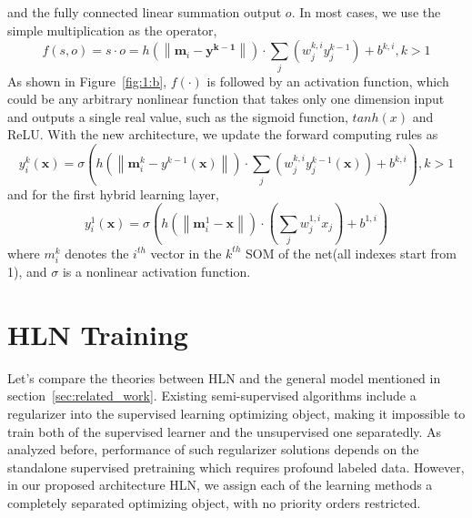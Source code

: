 \documentclass[3p,times,procedia]{elsarticle}
\begin{document}
and the fully connected linear summation 
output $o$. In most cases, we use the
simple multiplication as the operator,
\begin{equation}
	f(s,o) = s\cdot o = 
	h\left(
	\left\|
	\mathbf{m}_i-\mathbf{y^{k-1}}
	\right\|
	\right)
	\cdot
	\sum_j
	\left(
	w_j^{k,i}y_j^{k-1}
	\right)
	+b^{k,i},k>1
	\label{eq:14}
\end{equation}
As shown in Figure~\ref{fig:1:b}, 
$f(\cdot) $ is followed 
by an activation function, which could 
be any 
arbitrary nonlinear function that 
takes 
only one dimension input and 
outputs a 
single real value, 
such as the sigmoid function, 
$tanh(x)$ and ReLU. 
With the new 
architecture, 
we update the forward computing
rules as 
\begin{equation}
	y_i^k(\mathbf{x})=
	\sigma\left(
	h\left(
	\left\|
	\mathbf{m}_i^k-y^{k-1}(\mathbf{x})
	\right\|
	\right)\cdot
	\sum_j\left(
	w_j^{k,i}y_j^{k-1}(\mathbf{x})
	\right) + b^{k,i}
	\right), k>1
	\label{eq:15}
\end{equation}
and for the first hybrid learning layer,  
\begin{equation}
	y_i^1(\mathbf{x})=
	\sigma\left(
	h\left(
	\left\|
	\mathbf{m}_i^1-\mathbf{x}
	\right\|
	\right)\cdot
	\left(
	\sum_j w_j^{1,i}x_j
	\right) + b^{1,i}
	\right)
	\label{eq:16}
\end{equation}
where $m^k_i$ denotes the $i^{th}$ 
vector in the $k^{th}$ SOM of 
the net(all indexes start from 1), 
and $\sigma$ is a nonlinear 
activation function.

\section{HLN Training}
Let's compare the theories between
HLN and the general model mentioned 
in section~\ref{sec:related_work}.
Existing semi-supervised algorithms
include a regularizer into the supervised
learning optimizing object, making it 
impossible to train both of
the supervised learner and the 
unsupervised one
separatedly. As analyzed before, 
performance
of such regularizer solutions depends 
on the
standalone supervised pretraining 
which requires profound labeled data.
However, in our proposed architecture 
HLN, we assign
each of the learning methods a 
completely
separated optimizing object, with no 
priority
orders restricted.
\end{document}
